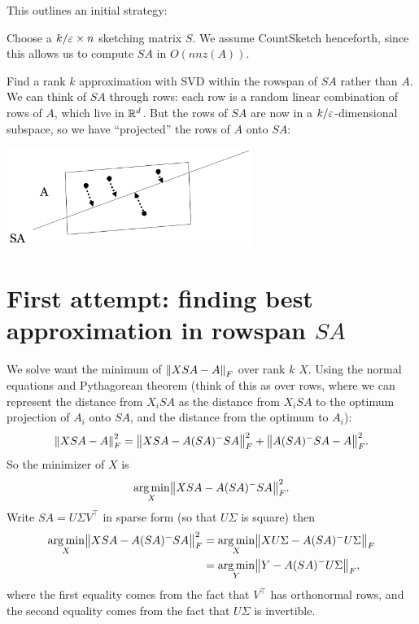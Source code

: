 \documentclass{article}
\begin{document}
This outlines an initial strategy: 
\begin{enum}
    \item Choose a $k/\eps \times n$ sketching matrix $S$. We assume CountSketch henceforth, since this allows us to compute $SA$ in $O(nnz(A))$. 
    \item Find a rank $k$ approximation with SVD within the rowspan of $SA$ rather than $A$. We can think of $SA$ through rows: each row is a random linear combination of rows of $A$, which live in $\R^d $. But the rows of $SA$ are now in a $k/\eps $-dimensional subspace, so we have ``projected'' the rows of $A$ onto $SA$: 
     \begin{center}
        \includegraphics[width=0.6\textwidth]{images/2025-02-15-00-36-11.png}
      \end{center} 
\end{enum}

\section{First attempt: finding best approximation in rowspan $SA$}
We solve want the minimum of $\norm*{XSA - A}_{F} $ over rank $k$ $X$. Using the normal equations and Pythagorean theorem (think of this as over rows, where we can represent the distance from $X_i SA$ as the distance from $X_i SA$ to the optimum projection of $A_i $ onto $SA$, and the distance from the optimum to $A_i $):
\[
    \norm*{XSA - A}_{F} ^2  = \norm*{XSA - A(SA)^- SA}_{F} ^2 + \norm*{A(SA)^- SA - A}_{F}^2 . 
\]
So the minimizer of $X$ is 
\[
    \argmin_{X} \norm*{XSA - A(SA)^- SA}_{F}^2  . 
\]
Write $SA = U \Sigma V^{\top} $ in sparse form (so that $U\Sigma $ is square) then 
\begin{align*}
    \argmin_{X} \norm*{XSA - A(SA)^- SA}_{F}^2 &= \argmin_{X} \norm*{XU\Sigma  - A(SA)^- U \Sigma }_{F} \\
    &= \argmin_{Y} \norm*{Y - A(SA)^- U\Sigma }_{F} ,
\end{align*}
where the first equality comes from the fact that $V^{\top} $ has orthonormal rows, and the second equality comes from the fact that $U \Sigma $ is invertible. 
\end{document}
